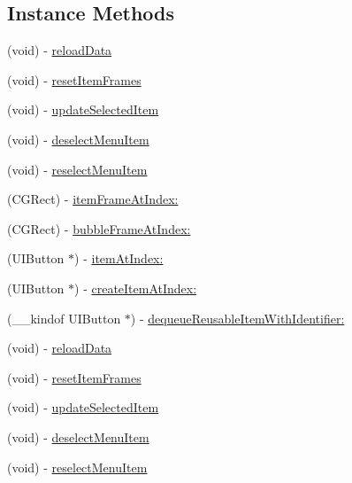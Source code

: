 \subsection*{Instance Methods}
\begin{DoxyCompactItemize}
\item 
(void) -\/ \mbox{\hyperlink{interface_v_t_menu_bar_a40cf86d3f53b0694047557db6d73d3a8}{reload\+Data}}
\item 
(void) -\/ \mbox{\hyperlink{interface_v_t_menu_bar_a877e09cfa864c23b222097c4ca18d377}{reset\+Item\+Frames}}
\item 
(void) -\/ \mbox{\hyperlink{interface_v_t_menu_bar_afde29cf6a8858987b2c839de44455e4c}{update\+Selected\+Item}}
\item 
(void) -\/ \mbox{\hyperlink{interface_v_t_menu_bar_a8539552ebb1885de47bad0ee12416c18}{deselect\+Menu\+Item}}
\item 
(void) -\/ \mbox{\hyperlink{interface_v_t_menu_bar_ae119d889377771b0513ce85bb7582a12}{reselect\+Menu\+Item}}
\item 
(C\+G\+Rect) -\/ \mbox{\hyperlink{interface_v_t_menu_bar_ab9b968d5635a07a921bea02b7ea019c3}{item\+Frame\+At\+Index\+:}}
\item 
(C\+G\+Rect) -\/ \mbox{\hyperlink{interface_v_t_menu_bar_a917d8914840aa425cd46b272b80854a8}{bubble\+Frame\+At\+Index\+:}}
\item 
(U\+I\+Button $\ast$) -\/ \mbox{\hyperlink{interface_v_t_menu_bar_a99f0f75a9516d06886df6c33e487b6e4}{item\+At\+Index\+:}}
\item 
(U\+I\+Button $\ast$) -\/ \mbox{\hyperlink{interface_v_t_menu_bar_ae78207b0eeb1d9e9597a297db6199403}{create\+Item\+At\+Index\+:}}
\item 
(\+\_\+\+\_\+kindof U\+I\+Button $\ast$) -\/ \mbox{\hyperlink{interface_v_t_menu_bar_a4a6880a54b350598f4ba913d4d9a3469}{dequeue\+Reusable\+Item\+With\+Identifier\+:}}
\item 
(void) -\/ \mbox{\hyperlink{interface_v_t_menu_bar_a40cf86d3f53b0694047557db6d73d3a8}{reload\+Data}}
\item 
(void) -\/ \mbox{\hyperlink{interface_v_t_menu_bar_a877e09cfa864c23b222097c4ca18d377}{reset\+Item\+Frames}}
\item 
(void) -\/ \mbox{\hyperlink{interface_v_t_menu_bar_afde29cf6a8858987b2c839de44455e4c}{update\+Selected\+Item}}
\item 
(void) -\/ \mbox{\hyperlink{interface_v_t_menu_bar_a8539552ebb1885de47bad0ee12416c18}{deselect\+Menu\+Item}}
\item 
(void) -\/ \mbox{\hyperlink{interface_v_t_menu_bar_ae119d889377771b0513ce85bb7582a12}{reselect\+Menu\+Item}}

\end{DoxyCompactItemize}

